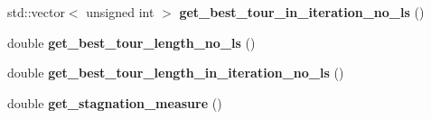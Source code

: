 \begin{CompactItemize}
\item 
\hypertarget{classAntColony_ca741db15566fb6cb9b9f565c9a772f8}{
std::vector$<$ unsigned int $>$ \textbf{get\_\-best\_\-tour\_\-in\_\-iteration\_\-no\_\-ls} ()}
\label{classAntColony_ca741db15566fb6cb9b9f565c9a772f8}

\item 
\hypertarget{classAntColony_c47e768d53f1454d4bfb471527b04f24}{
double \textbf{get\_\-best\_\-tour\_\-length\_\-no\_\-ls} ()}
\label{classAntColony_c47e768d53f1454d4bfb471527b04f24}

\item 
\hypertarget{classAntColony_ac831365482977d9ed7ca081a1186721}{
double \textbf{get\_\-best\_\-tour\_\-length\_\-in\_\-iteration\_\-no\_\-ls} ()}
\label{classAntColony_ac831365482977d9ed7ca081a1186721}

\item 
\hypertarget{classAntColony_e54c224b8a7d28dfeed617aae34a8ab7}{
double \textbf{get\_\-stagnation\_\-measure} ()}
\label{classAntColony_e54c224b8a7d28dfeed617aae34a8ab7}

\end{CompactItemize}
